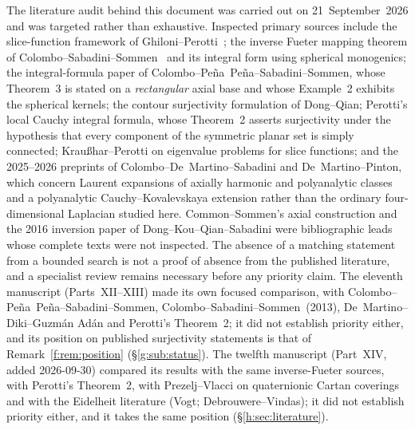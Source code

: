 \documentclass[11pt,a4paper]{article}
\numberwithin{equation}{section}
\theoremstyle{definition}
\theoremstyle{remark}
\theoremstyle{plain}
\begin{document}
The literature audit behind this document was carried out on
21~September~2026 and was targeted rather than exhaustive. Inspected
primary sources include the slice-function framework of Ghiloni--Perotti~\cite{GP};
the inverse Fueter mapping theorem of Colombo--Sabadini--Sommen~\cite{CSS} and its
integral form using spherical monogenics; the integral-formula paper of
Colombo--Pe\~na~Pe\~na--Sabadini--Sommen, whose Theorem~3 is stated on a
\emph{rectangular} axial base and whose Example~2 exhibits the spherical
kernels; the contour surjectivity formulation of Dong--Qian; Perotti's
local Cauchy integral formula, whose Theorem~2 asserts surjectivity under
the hypothesis that every component of the symmetric planar set is simply
connected; Krau\ss har--Perotti on eigenvalue problems for slice functions;
and the 2025--2026 preprints of Colombo--De~Martino--Sabadini and
De~Martino--Pinton, which concern Laurent expansions of axially harmonic
and polyanalytic classes and a polyanalytic Cauchy--Kovalevskaya extension
rather than the ordinary four-dimensional Laplacian studied here.
Common--Sommen's axial construction and the 2016 inversion paper of
Dong--Kou--Qian--Sabadini were bibliographic leads whose complete texts
were not inspected. The absence of a matching statement from a bounded
search is not a proof of absence from the published literature, and a
specialist review remains necessary before any priority claim. The eleventh
manuscript (Parts~XII--XIII) made its own focused comparison, with
Colombo--Pe\~na~Pe\~na--Sabadini--Sommen, Colombo--Sabadini--Sommen~(2013),
De~Martino--Diki--Guzm\'an Ad\'an and Perotti's Theorem~2; it did not
establish priority either, and its position on published surjectivity
statements is that of Remark~\ref{f:rem:position} (\S\ref{g:sub:status}).
The twelfth manuscript (Part~XIV, added 2026-09-30) compared its results
with the same inverse-Fueter sources, with Perotti's Theorem~2, with
Prezelj--Vlacci on quaternionic Cartan coverings and with the Eidelheit
literature (Vogt; Debrouwere--Vindas); it did not establish priority either,
and it takes the same position (\S\ref{h:sec:literature}).
\end{document}
